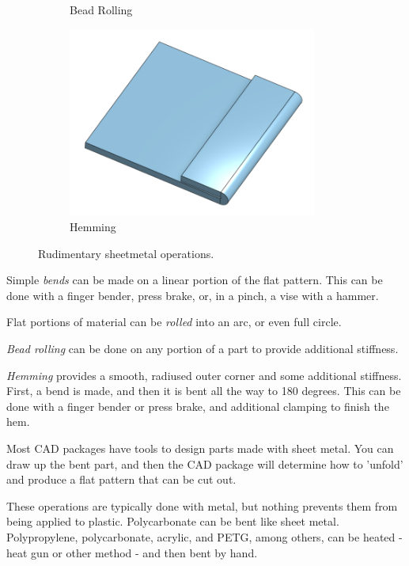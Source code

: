\documentclass[10pt,letterpaper]{book}
\begin{document}
\begin{figure}[H]
\begin{subfigure}[b]{.24\linewidth}
			\caption{Bead Rolling}
		\end{subfigure}\begin{subfigure}[b]{.24\linewidth}
			\includegraphics[width=0.9\textwidth]{imgs/sheet_hem.png}
			\caption{Hemming}
		\end{subfigure}
		\caption{Rudimentary sheetmetal operations.}
	\end{figure} 
 
 \begin{asparaenum}[a)]
 	\item Simple \textit{bends} can be made on a linear portion of the flat pattern. This can be done with a finger bender, press brake, or, in a pinch, a vise with a hammer.
 	\item Flat portions of material can be \textit{rolled} into an arc, or even full circle.
 	\item \textit{Bead rolling} can be done on any portion of a part to provide additional stiffness.	
 	\item \textit{Hemming} provides a smooth, radiused outer corner and some additional stiffness. First, a bend is made, and then it is bent all the way to 180 degrees. This can be done with a finger bender or press brake, and additional clamping to finish the hem.
 	\end{asparaenum}
 	
 	Most CAD packages have tools to design parts made with sheet metal. You can draw up the bent part, and then the CAD package will determine how to 'unfold' and produce a flat pattern that can be cut out.
 	
 	These operations are typically done with metal, but nothing prevents them from being applied to plastic. Polycarbonate can be bent like sheet metal. Polypropylene, polycarbonate, acrylic, and PETG, among others, can be heated - heat gun or other method - and then bent by hand.
 	
\end{document}
